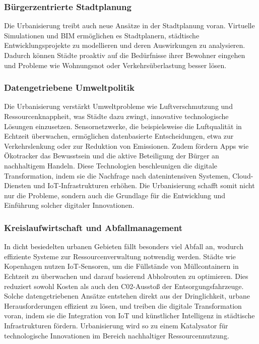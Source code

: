 \documentclass[conference,compsoc,final,a4paper, onecolumn, 11pt]{IEEEtran}
\begin{document}
\subsubsection{Bürgerzentrierte Stadtplanung}
Die Urbanisierung treibt auch neue Ansätze in der Stadtplanung voran. 
Virtuelle Simulationen und \ac{BIM} ermöglichen es Stadtplanern, städtische Entwicklungsprojekte zu modellieren und deren Auswirkungen zu analysieren. 
Dadurch können Städte proaktiv auf die Bedürfnisse ihrer Bewohner eingehen und Probleme wie Wohnungsnot oder Verkehrsüberlastung besser lösen.\autocite{mckinsey_smart_cities}


\subsubsection{Datengetriebene Umweltpolitik}
Die Urbanisierung verstärkt Umweltprobleme wie Luftverschmutzung und Ressourcenknappheit, was Städte dazu zwingt, innovative technologische Lösungen einzusetzen. 
Sensornetzwerke, die beispielsweise die Luftqualität in Echtzeit überwachen, ermöglichen datenbasierte Entscheidungen, etwa zur Verkehrslenkung oder zur Reduktion von Emissionen. 
Zudem fördern Apps wie Ökotracker das Bewusstsein und die aktive Beteiligung der Bürger an nachhaltigem Handeln. 
Diese Technologien beschleunigen die digitale Transformation, indem sie die Nachfrage nach datenintensiven Systemen, Cloud-Diensten und \ac{IoT}-Infrastrukturen erhöhen. 
Die Urbanisierung schafft somit nicht nur die Probleme, sondern auch die Grundlage für die Entwicklung und Einführung solcher digitaler Innovationen.\autocite{mdpi_smart_cities_iot}

 
\subsubsection{Kreislaufwirtschaft und Abfallmanagement}
In dicht besiedelten urbanen Gebieten fällt besonders viel Abfall an, wodurch effiziente Systeme zur Ressourcenverwaltung notwendig werden. 
Städte wie Kopenhagen nutzen \ac{IoT}-Sensoren, um die Füllstände von Müllcontainern in Echtzeit zu überwachen und darauf basierend Abholrouten zu optimieren. 
Dies reduziert sowohl Kosten als auch den C02-Ausstoß der Entsorgungsfahrzeuge. 
Solche datengetriebenen Ansätze entstehen direkt aus der Dringlichkeit, urbane Herausforderungen effizient zu lösen, und treiben die digitale Transformation voran, indem sie die Integration von IoT und künstlicher Intelligenz in städtische Infrastrukturen fördern. 
Urbanisierung wird so zu einem Katalysator für technologische Innovationen im Bereich nachhaltiger Ressourcennutzung.\autocite{mdpi_smart_cities_iot}
\end{document}
